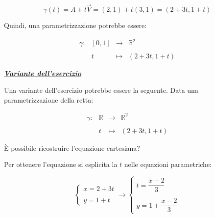 \documentclass[a4paper]{article}
\begin{document}
	\begin{equation*}
		\gamma\left(t\right) = A + t\overrightarrow{V} = \left(2,1\right) + t\left(3,1\right) = \left(2 + 3t, 1 + t\right)
	\end{equation*}

	\noindent
	Quindi, una parametrizzazione potrebbe essere:
	
	\begin{equation*}
		\begin{array}{llll}
			\gamma: & \left[0,1\right] & \longrightarrow & \mathbb{R}^{2} \\
			&&& \\
			& t & \longmapsto & \left(2 + 3t, 1 + t\right)
		\end{array}
	\end{equation*}

	\newpage

	\noindent
	\textcolor{Red3}{\textbf{\underline{\emph{Variante dell'esercizio}}}}\newline
	
	\noindent
	Una variante dell'esercizio potrebbe essere la seguente. Data una parametrizzazione della retta:
	
	\begin{equation*}
		\begin{array}{llll}
			\gamma: & \mathbb{R} & \longrightarrow & \mathbb{R}^{2} \\
			&&& \\
			& t & \longmapsto & \left(2 + 3t, 1 + t\right)
		\end{array}
	\end{equation*}

	\noindent
	È possibile ricostruire l'equazione cartesiana?\newline
	
	\noindent
	Per ottenere l'equazione si esplicita la $t$ nelle equazioni parametriche:
	
	\begin{equation*}
		\begin{cases}
			x = 2 + 3t \\
			\\
			y = 1 + t
		\end{cases}
		\longrightarrow
		\begin{cases}
			t = \dfrac{x - 2}{3} \\
			\\
			y = 1 + \dfrac{x - 2}{3}
		\end{cases}
	\end{equation*}
\end{document}
